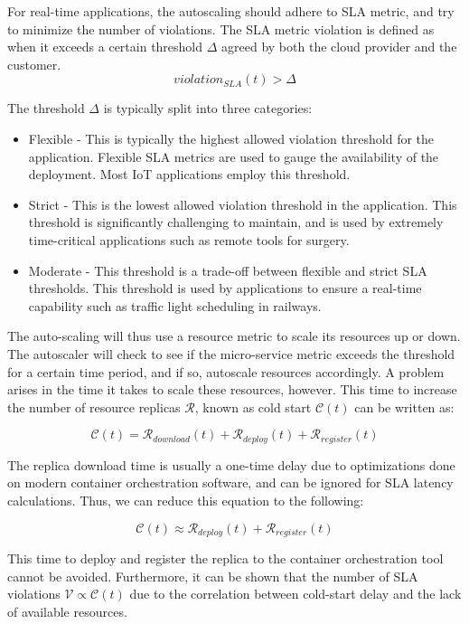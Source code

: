 For real-time applications, the autoscaling should adhere to SLA metric, and try to minimize the number of violations. The SLA metric violation is defined as when it exceeds a certain threshold $\Delta$ agreed by both the cloud provider and the customer.
\[ violation_{SLA}(t) > \Delta \]

The threshold $\Delta$ is typically split into three categories:
\begin{itemize}
    \item Flexible - This is typically the highest allowed violation threshold for the application. Flexible SLA metrics are used to gauge the availability of the deployment. Most IoT applications employ this threshold.
    \item Strict - This is the lowest allowed violation threshold in the application. This threshold is significantly challenging to maintain, and is used by extremely time-critical applications such as remote tools for surgery.
    \item Moderate - This threshold is a trade-off between flexible and strict SLA thresholds. This threshold is used by applications to ensure a real-time capability such as traffic light scheduling in railways.
\end{itemize}

The auto-scaling will thus use a resource metric to scale its resources up or down. The autoscaler will check to see if the micro-service metric exceeds the threshold for a certain time period, and if so, autoscale resources accordingly. A problem arises in the time it takes to scale these resources, however. This time to increase the number of resource replicas $\mathcal{R}$, known as cold start $\mathcal{C}(t)$ can be written as:

\[ \mathcal{C}(t) = \mathcal{R}_{download}(t) + \mathcal{R}_{deploy}(t) + \mathcal{R}_{register}(t)\]

The replica download time is usually a one-time delay due to optimizations done on modern container orchestration software, and can be ignored for SLA latency calculations. Thus, we can reduce this equation to the following:

\[ \mathcal{C}(t) \approx \mathcal{R}_{deploy}(t) + \mathcal{R}_{register}(t)\]

This time to deploy and register the replica to the container orchestration tool cannot be avoided. Furthermore, it can be shown that the number of SLA violations $\mathcal{V} \propto \mathcal{C}(t)$ due to the correlation between cold-start delay and the lack of available resources.\par

